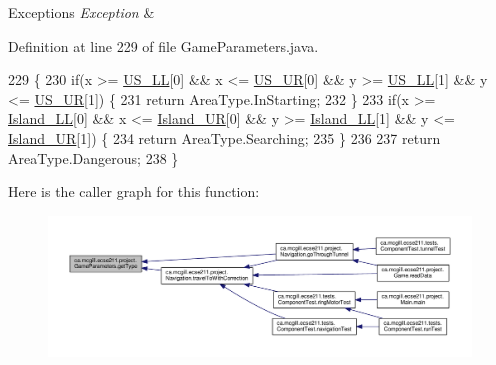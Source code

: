 \begin{DoxyExceptions}{Exceptions}
{\em Exception} & \\
\hline
\end{DoxyExceptions}


Definition at line 229 of file Game\+Parameters.\+java.


\begin{DoxyCode}
229                                               \{
230     \textcolor{keywordflow}{if}(x >= \hyperlink{enumca_1_1mcgill_1_1ecse211_1_1project_1_1_game_parameters_a4b437dfb1ca3a0898631dfd670828202}{US\_LL}[0] && x <= \hyperlink{enumca_1_1mcgill_1_1ecse211_1_1project_1_1_game_parameters_ab53ad7cced40d028fd0bbc3472cd2f8d}{US\_UR}[0] && y >= \hyperlink{enumca_1_1mcgill_1_1ecse211_1_1project_1_1_game_parameters_a4b437dfb1ca3a0898631dfd670828202}{US\_LL}[1] && y <= 
      \hyperlink{enumca_1_1mcgill_1_1ecse211_1_1project_1_1_game_parameters_ab53ad7cced40d028fd0bbc3472cd2f8d}{US\_UR}[1]) \{
231       \textcolor{keywordflow}{return} AreaType.InStarting;
232     \}
233     \textcolor{keywordflow}{if}(x >= \hyperlink{enumca_1_1mcgill_1_1ecse211_1_1project_1_1_game_parameters_a70576bc98218fc0b4a7b2d3b2d56ed2b}{Island\_LL}[0] && x <= \hyperlink{enumca_1_1mcgill_1_1ecse211_1_1project_1_1_game_parameters_ac442a5d4a39d6ffae29a183eca5934d3}{Island\_UR}[0] && y >= 
      \hyperlink{enumca_1_1mcgill_1_1ecse211_1_1project_1_1_game_parameters_a70576bc98218fc0b4a7b2d3b2d56ed2b}{Island\_LL}[1] && y <= \hyperlink{enumca_1_1mcgill_1_1ecse211_1_1project_1_1_game_parameters_ac442a5d4a39d6ffae29a183eca5934d3}{Island\_UR}[1]) \{
234       \textcolor{keywordflow}{return} AreaType.Searching;
235     \}
236     
237     \textcolor{keywordflow}{return} AreaType.Dangerous;
238   \}
\end{DoxyCode}
Here is the caller graph for this function\+:
\nopagebreak
\begin{figure}[H]
\begin{center}
\leavevmode
\includegraphics[width=350pt]{enumca_1_1mcgill_1_1ecse211_1_1project_1_1_game_parameters_a4e7713b30588fc0b2af065db0b198b2c_icgraph}
\end{center}
\end{figure}


